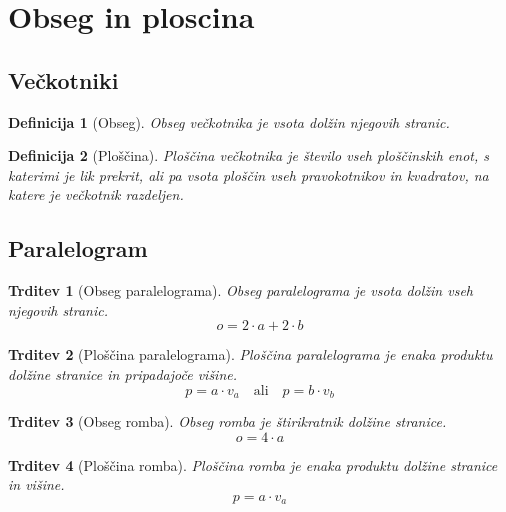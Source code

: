 \documentclass{article}
\newtheorem{definicija}{Definicija}[subsection]
\newtheorem{trditev}{Trditev}[subsection]
\begin{document}
\pagestyle{empty}

\begin{comment}
definitions
\end{comment}

\section{ Obseg in ploscina }
\subsection{ Večkotniki }

\begin{definicija}[Obseg]
    Obseg večkotnika je vsota dolžin njegovih stranic.
\end{definicija}

\begin{definicija}[Ploščina]
    Ploščina večkotnika je število vseh ploščinskih enot, s katerimi je lik prekrit, ali pa vsota ploščin vseh pravokotnikov in kvadratov, na katere je večkotnik razdeljen.
\end{definicija}

\pagebreak
\subsection{ Paralelogram }

\begin{trditev}[Obseg paralelograma]
    Obseg paralelograma je vsota dolžin vseh njegovih stranic.
    \[ o = 2 \cdot a + 2 \cdot b \]
\end{trditev}

\begin{trditev}[Ploščina paralelograma]
    Ploščina paralelograma je enaka produktu dolžine stranice in pripadajoče višine.
    \[ p = a \cdot v_a \quad \text{ali} \quad p = b \cdot v_b \]
\end{trditev}

\begin{trditev}[Obseg romba]
    Obseg romba je štirikratnik dolžine stranice.
    \[ o = 4 \cdot a \]
\end{trditev}

\begin{trditev}[Ploščina romba]
    Ploščina romba je enaka produktu dolžine stranice in višine.
    \[ p = a \cdot v_a \]
\end{trditev}
\end{document}
